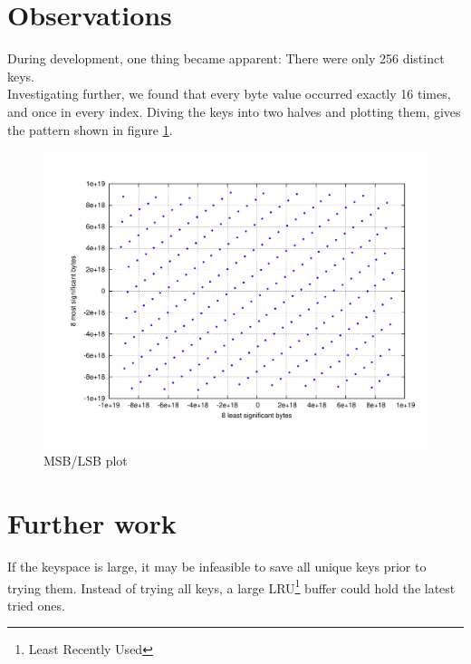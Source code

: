 \documentclass[10pt,a4paper]{article}
\begin{document}
\section*{Observations}
During development, one thing became apparent: There were only 256 distinct keys.\\
Investigating further, we found that every byte value occurred exactly 16 times, and once in every index. Diving the keys into two halves and plotting them, gives the pattern shown in figure \ref{fig:scatter_plot}.
\begin{figure}[h]
\includegraphics[scale=0.45]{../output/scatter.pdf}
\caption{MSB/LSB plot}
\label{fig:scatter_plot}
\end{figure}


\section*{Further work}
If the keyspace is large, it may be infeasible to save all unique keys prior to trying them. Instead of trying all keys, a large LRU\footnote{Least Recently Used} buffer could hold the latest tried ones.
\end{document}
